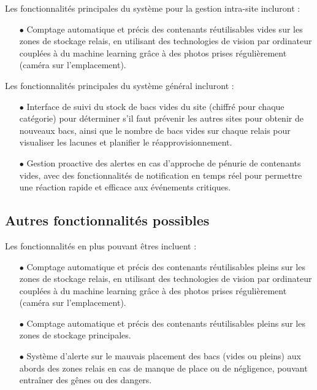 Les fonctionnalités principales du système pour la gestion intra-site incluront :\\

\begin{itemize}
    \item[$\bullet$] Comptage automatique et précis des contenants réutilisables vides sur les zones de stockage relais, en utilisant des technologies de vision par ordinateur couplées à du machine learning grâce à des photos prises régulièrement (caméra sur l'emplacement).\\
\end{itemize}

Les fonctionnalités principales du système général incluront :\\

\begin{itemize}
    \item[$\bullet$] Interface de suivi du stock de bacs vides du site (chiffré pour chaque catégorie) pour déterminer s'il faut prévenir les autres sites pour obtenir de nouveaux bacs, ainsi que le nombre de bacs vides sur chaque relais pour visualiser les lacunes et planifier le réapprovisionnement.
    \item[$\bullet$] Gestion proactive des alertes en cas d'approche de pénurie de contenants vides, avec des fonctionnalités de notification en temps réel pour permettre une réaction rapide et efficace aux événements critiques.\\
\end{itemize}

\subsection{Autres fonctionnalités possibles}

Les fonctionnalités en plus pouvant êtres incluent :\\

\begin{itemize}
    \item[$\bullet$] Comptage automatique et précis des contenants réutilisables pleins sur les zones de stockage relais, en utilisant des technologies de vision par ordinateur couplées à du machine learning grâce à des photos prises régulièrement (caméra sur l'emplacement).
    \item[$\bullet$] Comptage automatique et précis des contenants réutilisables pleins sur les zones de stockage principales.
    \item[$\bullet$] Système d'alerte sur le mauvais placement des bacs (vides ou pleins) aux abords des zones relais en cas de manque de place ou de négligence, pouvant entraîner des gênes ou des dangers.\\
\end{itemize}
